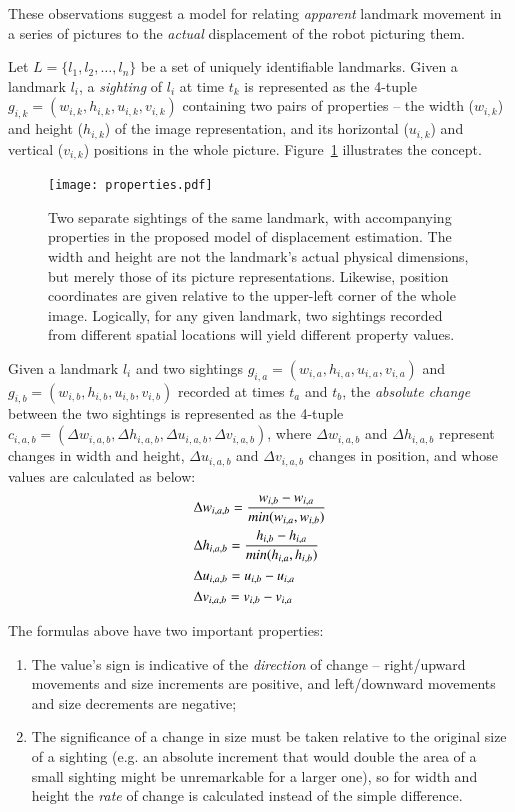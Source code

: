 \documentclass[twocolumn, 9pt]{jsproceedings}
\begin{document}
These observations suggest a model for relating {\it apparent} landmark movement in a series of pictures to the {\it actual} displacement of the robot picturing them.

Let \(L = \{l_1, l_2, \dotsc, l_n\}\) be a set of uniquely identifiable landmarks. Given a landmark \(l_i\), a {\it sighting} of \(l_i\) at time \(t_k\) is represented as the 4-tuple \(g_{i,k} = (w_{i,k}, h_{i,k}, u_{i,k}, v_{i,k})\) containing two pairs of properties -- the width (\(w_{i,k}\)) and height (\(h_{i,k}\)) of the image representation, and its horizontal (\(u_{i,k}\)) and vertical (\(v_{i,k}\)) positions in the whole picture. Figure~\ref{fig:properties} illustrates the concept.

\begin{figure}[h!]
\texttt{[image: properties.pdf]}
\caption{Two separate sightings of the same landmark, with accompanying properties in the proposed model of displacement estimation. The width and height are not the landmark's actual physical dimensions, but merely those of its picture representations. Likewise, position coordinates are given relative to the upper-left corner of the whole image. Logically, for any given landmark, two sightings recorded from different spatial locations will yield different property values.}
\label{fig:properties}
\end{figure}

Given a landmark \(l_i\) and two sightings \(g_{i,a} = (w_{i,a}, h_{i,a}, u_{i,a}, v_{i,a})\) and \(g_{i,b} = (w_{i,b}, h_{i,b}, u_{i,b}, v_{i,b})\) recorded at times \(t_a\) and \(t_b\), the {\it absolute change} between the two sightings is represented as the 4-tuple \(c_{i,a,b} = (\Delta w_{i,a,b}, \Delta h_{i,a,b}, \Delta u_{i,a,b}, \Delta v_{i,a,b})\), where \(\Delta w_{i,a,b}\) and \(\Delta h_{i,a,b}\) represent changes in width and height, \(\Delta u_{i,a,b}\) and \(\Delta v_{i,a,b}\) changes in position, and whose values are calculated as below:
\begin{align}
& \Delta w_{i,a,b} = \frac{w_{i,b} - w_{i,a}}{min(w_{i,a}, w_{i,b})} \\
& \Delta h_{i,a,b} = \frac{h_{i,b} - h_{i,a}}{min(h_{i,a}, h_{i,b})} \notag\\
& \Delta u_{i,a,b} = u_{i,b} - u_{i,a} \notag\\
& \Delta v_{i,a,b} = v_{i,b} - v_{i,a} \notag
\end{align}

The formulas above have two important properties:

\begin{enumerate}
\item The value's sign is indicative of the {\it direction} of change -- right/upward movements and size increments are positive, and left/downward movements and size decrements are negative;
\item The significance of a change in size must be taken relative to the original size of a sighting (e.g. an absolute increment that would double the area of a small sighting might be unremarkable for a larger one), so for width and height the {\it rate} of change is calculated instead of the simple difference.
\end{enumerate}
\end{document}
